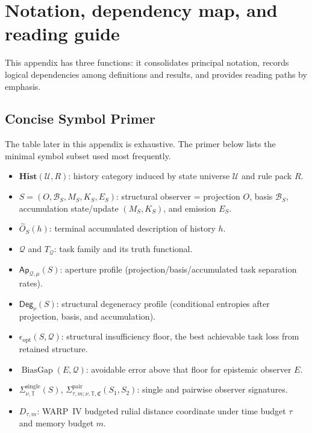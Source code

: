\documentclass[11pt,twoside]{article}
\theoremstyle{definition}
\newcommand{\Hist}{\mathbf{Hist}}
\newcommand{\TaskBundle}{\mathbb{T}}
\DeclareMathOperator{\BiasGap}{BiasGap}
\begin{document}
\section{Notation, dependency map, and reading guide}
\label{app:notation-dependency}

This appendix has three functions: it consolidates principal notation, records logical dependencies among definitions and results, and provides reading paths by emphasis.

\subsection{Concise Symbol Primer}
\label{app:two-minute-symbol-primer}

The table later in this appendix is exhaustive. The primer below lists the minimal symbol subset used most frequently.
\begin{itemize}[leftmargin=*]
  \item \(\Hist(\mathcal{U},R)\): history category induced by state universe \(\mathcal{U}\) and rule pack \(R\).
  \item \(S=(O,\mathcal{B}_S,M_S,K_S,E_S)\): structural observer = projection \(O\), basis \(\mathcal{B}_S\), accumulation state/update \((M_S,K_S)\), and emission \(E_S\).
  \item \(\widehat{O}_S(h)\): terminal accumulated description of history \(h\).
  \item \(\mathcal{Q}\) and \(T_{\mathcal{Q}}\): task family and its truth functional.
  \item \(\mathsf{Ap}_{\mathcal{Q},\mu}(S)\): aperture profile (projection/basis/accumulated task separation rates).
  \item \(\mathsf{Deg}_{\nu}(S)\): structural degeneracy profile (conditional entropies after projection, basis, and accumulation).
  \item \(\epsilon_{\mathrm{opt}}(S,\mathcal{Q})\): structural insufficiency floor, the best achievable task loss from retained structure.
  \item \(\BiasGap(E,\mathcal{Q})\): avoidable error above that floor for epistemic observer \(E\).
  \item \(\Sigma^{\mathrm{single}}_{\nu,\TaskBundle}(S)\), \(\Sigma^{\mathrm{pair}}_{\tau,m;\nu,\TaskBundle,\mathfrak{C}}(S_1,S_2)\): single and pairwise observer signatures.
  \item \(D_{\tau,m}\): WARP~IV budgeted rulial distance coordinate under time budget \(\tau\) and memory budget \(m\).
\end{itemize}
\end{document}
